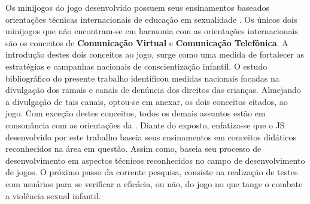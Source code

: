 Os minijogos do jogo desenvolvido possuem seus ensinamentos baseados orientações técnicas internacionais de educação em sexualidade \cite{unesco2018international}. Os únicos dois minijogos que não encontram-se em harmonia com as orientações internacionais são os conceitos de \textbf{Comunicação Virtual} e \textbf{Comunicação Telefônica}. A introdução destes dois conceitos ao jogo, surge como uma medida de fortalecer as estratégias e campanhas nacionais de conscientização infantil. O estudo bibliográfico do presente trabalho identificou medidas nacionais focadas na divulgação dos ramais e canais de denúncia dos direitos das crianças. Almejando a divulgação de tais canais, optou-se em anexar, os dois conceitos citados, ao jogo. Com exceção destes conceitos, todos os demais assuntos estão em consonância com as orientações da . Diante do exposto, enfatiza-se que o \ac{JS} desenvolvido por este trabalho baseia seus ensinamentos em conceitos didáticos reconhecidos na área em questão. Assim como, baseia seu processo de desenvolvimento em aspectos técnicos reconhecidos no campo de  desenvolvimento de jogos. O próximo passo da corrente pesquisa, consiste na realização de testes com usuários para se verificar a eficácia, ou não, do jogo no que tange o combate a violência sexual infantil. 